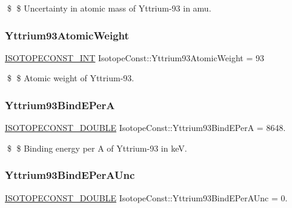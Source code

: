 \$ \$ Uncertainty in atomic mass of Yttrium-\/93 in amu. \mbox{\label{group___isotope_const-_yttrium-_y93_ga103c4c6f06c98a4a3c57879a36da5a59}} 
\subsubsection{\texorpdfstring{Yttrium93\+Atomic\+Weight}{Yttrium93AtomicWeight}}
{\footnotesize\ttfamily \mbox{\hyperlink{group___isotope_const-_macros_ga5f18360b3e99483a35c32d789e62621c}{I\+S\+O\+T\+O\+P\+E\+C\+O\+N\+S\+T\+\_\+\+I\+NT}} Isotope\+Const\+::\+Yttrium93\+Atomic\+Weight = 93}

\$ \$ Atomic weight of Yttrium-\/93. \mbox{\label{group___isotope_const-_yttrium-_y93_gaa89526f746d1e34cca5606a2290def11}} 
\subsubsection{\texorpdfstring{Yttrium93\+Bind\+E\+PerA}{Yttrium93BindEPerA}}
{\footnotesize\ttfamily \mbox{\hyperlink{group___isotope_const-_macros_ga8f45a7272ce02c0b4c65c44636ed719a}{I\+S\+O\+T\+O\+P\+E\+C\+O\+N\+S\+T\+\_\+\+D\+O\+U\+B\+LE}} Isotope\+Const\+::\+Yttrium93\+Bind\+E\+PerA = 8648.}

\$ \$ Binding energy per A of Yttrium-\/93 in keV. \mbox{\label{group___isotope_const-_yttrium-_y93_ga962fd0cd7079679634a637b034132d53}} 
\subsubsection{\texorpdfstring{Yttrium93\+Bind\+E\+Per\+A\+Unc}{Yttrium93BindEPerAUnc}}
{\footnotesize\ttfamily \mbox{\hyperlink{group___isotope_const-_macros_ga8f45a7272ce02c0b4c65c44636ed719a}{I\+S\+O\+T\+O\+P\+E\+C\+O\+N\+S\+T\+\_\+\+D\+O\+U\+B\+LE}} Isotope\+Const\+::\+Yttrium93\+Bind\+E\+Per\+A\+Unc = 0.}

